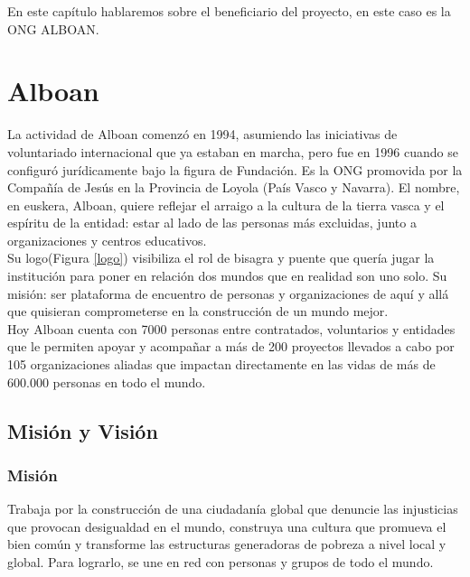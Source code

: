 \smallbreak %
En este capítulo hablaremos sobre el beneficiario del proyecto, en este caso es la ONG ALBOAN.

\section{Alboan}

La actividad de Alboan comenzó en 1994, asumiendo las iniciativas de voluntariado
internacional que ya estaban en marcha, pero fue en 1996 cuando se configuró
jurídicamente bajo la figura de Fundación. Es la ONG promovida por la Compañía de Jesús en la Provincia de Loyola (País Vasco y Navarra). El nombre, en euskera, Alboan, quiere reflejar el arraigo a la cultura de la tierra vasca y el espíritu de la entidad: estar al lado de las personas más excluidas, junto a organizaciones y centros educativos.\\

Su logo(Figura \ref{logo}) visibiliza  el rol de bisagra y puente que quería jugar la institución para poner en relación dos mundos que en realidad son uno solo. Su misión: ser plataforma de encuentro de personas y organizaciones de aquí y allá que quisieran comprometerse en la construcción de un mundo mejor.\\

Hoy Alboan cuenta con 7000 personas entre contratados, voluntarios y entidades que le permiten apoyar y acompañar a más de 200 proyectos llevados a cabo por 105 organizaciones
aliadas que impactan directamente en las vidas de más de 600.000 personas en todo
el mundo.


\subsection{Misión y Visión}

\subsubsection{Misión}

Trabaja por la construcción de una ciudadanía global que denuncie las injusticias que provocan desigualdad en el mundo, construya una cultura que promueva el bien común y transforme las estructuras generadoras de pobreza a nivel local y global. Para lograrlo, se une en red con personas y grupos de todo el mundo.\\

